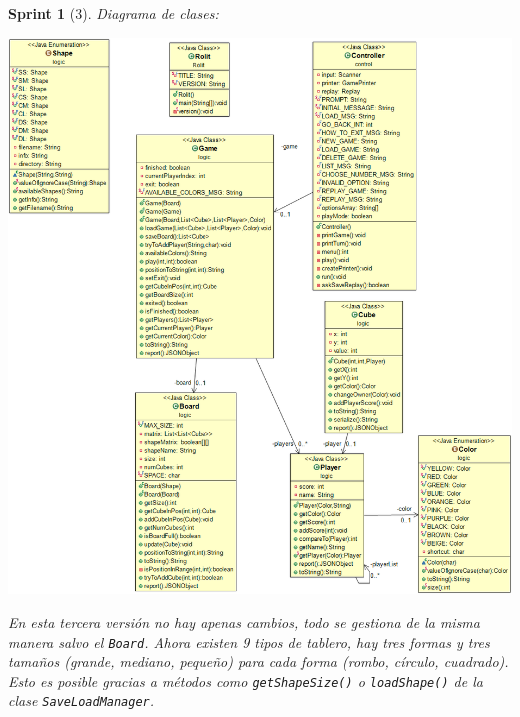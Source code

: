 \documentclass[12pt,a4paper,openright]{book}
\theoremstyle{break}
\newtheorem*{sprint}{Sprint}
\begin{document}
\begin{sprint}[3]
Diagrama de clases:
\begin{center}
\includegraphics[scale=0.35]{diagramaclasesS3.png}
\end{center}

En esta tercera versión no hay apenas cambios, todo se gestiona de la misma manera salvo el \texttt{Board}. Ahora existen 9 tipos de tablero, hay tres formas y tres tamaños (grande, mediano, pequeño) para cada forma (rombo, círculo, cuadrado). Esto es posible gracias a métodos como \texttt{getShapeSize()} o \texttt{loadShape()} de la clase \texttt{SaveLoadManager}. 

\end{sprint}
\newpage
\end{document}
